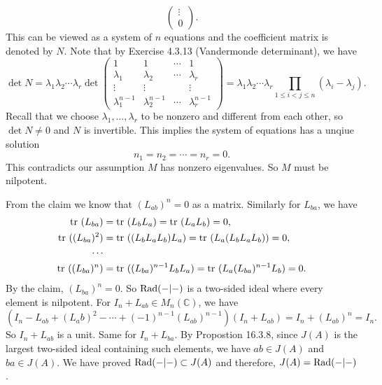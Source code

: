 \documentclass[a4paper, 12pt]{article}
\begin{document}
\begin{solution}
\begin{enumerate}[(1)]
\begin{claimproof}
\[\begin{pmatrix}
    \vdots\\ 
    0
\end{pmatrix}.\]
This can be viewed as a system of \(n\) equations and the coefficient matrix is denoted by \(N\). Note that by Exercise 4.3.13 (Vandermonde determinant), we have 
\[\det N=\lambda_1\lambda_2\cdots\lambda_r\det \begin{pmatrix}
    1&1&\cdots&1\\ 
    \lambda_1&\lambda_2&\cdots &\lambda_r\\ 
    \vdots&\vdots&&\vdots\\ 
    \lambda_1^{n-1}&\lambda_2^{n-1}&\cdots&\lambda_r^{n-1}
\end{pmatrix}=\lambda_1\lambda_2\cdots\lambda_r\prod_{1\leq i<j\leq n}(\lambda_i-\lambda_j).\]
Recall that we choose \(\lambda_1,\ldots,\lambda_r\) to be nonzero and different from each other, so \(\det N\neq 0\) and \(N\) is invertible. This implies the system of equations has a unqiue solution 
\[n_1=n_2=\cdots=n_r=0.\]
This contradicts our assumption \(M\) has nonzero eigenvalues. So \(M\) must be nilpotent. 
\end{claimproof}

From the claim we know that \((L_{ab})^n=0\) as a matrix. Similarly for \(L_{ba}\), we have 
\begin{align*}
\text{tr}\ (L_{ba})&=\text{tr}\ (L_bL_a)=\text{tr}\ (L_aL_b)=0,\\ 
\text{tr}\ ((L_{ba})^2)&=\text{tr}\ ((L_bL_aL_b)L_a)=\text{tr}\ (L_a(L_bL_aL_b))=0,\\ 
\cdots\\ 
\text{tr}\ ((L_{ba})^n)&=\text{tr}\ ((L_{ba})^{n-1}L_bL_a)=\text{tr}\ (L_a(L_{ba})^{n-1}L_b)=0.
\end{align*} 
By the claim, \((L_{ba})^n=0\). So \(\text{Rad}(-|-)\) is a two-sided ideal where every element is nilpotent. For \(I_n+L_{ab}\in M_n(\mathbb{C})\), we have 
\[(I_n-L_{ab}+(L_ab)^2-\cdots+(-1)^{n-1}(L_{ab})^{n-1})(I_n+L_{ab})=I_n+(L_{ab})^n=I_n.\]
So \(I_n+L_{ab}\) is a unit. Same for \(I_n+L_{ba}\). By Propostion 16.3.8, since \(J(A)\) is the largest two-sided ideal containing such elements, we have \(ab\in J(A)\) and \(ba\in J(A)\). We have 
proved \(\text{Rad}(-|-)\subset J(A)\) and therefore, \(J(A)=\text{Rad}(-|-)\).
\end{enumerate}
\end{solution}
\end{document}
